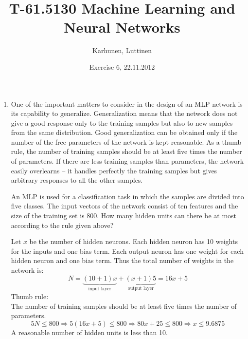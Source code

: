\title{T-61.5130 Machine Learning and Neural Networks}
\author{Karhunen, Luttinen}
\date{Exercise 6, 22.11.2012}

\newcommand{\vect}[1]{{\bf{#1}}}
\newcommand{\svect}[1]{\boldsymbol{#1}}
\newcommand{\matr}[1]{\boldsymbol{#1}}
\newcommand{\T}{\mathcal{T}}
\newcommand{\x}{{\bf x}}





\maketitle

\begin{enumerate}

\item One of the important matters to consider in the design of an MLP
  network is its capability to generalize. Generalization means that
  the network does not give a good response only to the training
  samples but also to new samples from the same distribution. Good
  generalization can be obtained only if the number of the free
  parameters of the network is kept reasonable. As a thumb rule, the
  number of training samples should be at least five times the number
  of parameters. If there are less training samples than parameters,
  the network easily overlearns -- it handles perfectly the training
  samples but gives arbitrary responses to all the other samples.

  An MLP is used for a classification task in which the samples are
  divided into five classes. The input vectors of the network consist
  of ten features and the size of the training set is 800. How many
  hidden units can there be at most according to the rule given above?

  \begin{solution}

    Let $x$ be the number of hidden neurons. Each hidden neuron has
    10 weights for the inputs and one bias term. Each output neuron has one
    weight for each hidden neuron and one bias term. Thus the total number
    of weights in the network is:
    \begin{equation*}
      N=\underbrace{(10+1)x}_{\text{input
          layer}}+\underbrace{(x+1)5}_{\text{output layer}}=16x+5
    \end{equation*}
    Thumb rule:\\
    The number of  training samples should be at least five times the
    number of parameters.
    \begin{equation*}
      5N\leq800 \Rightarrow 5(16x+5)\leq 800\Rightarrow 80x+25\leq
      800\Rightarrow x\leq9.6875
    \end{equation*}
    A reasonable number of hidden units is less than 10.
  \end{solution}
  


\end{enumerate}
